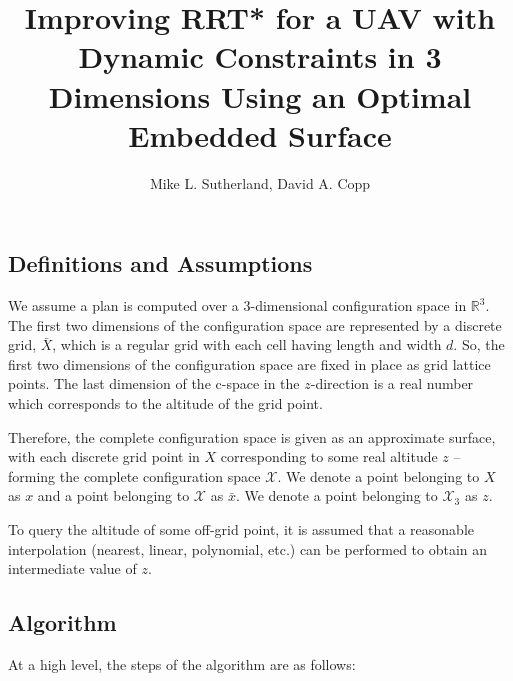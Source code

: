 \documentclass[letterpaper, 10 pt, conference]{ieeeconf}
\title{Improving RRT* for a UAV with Dynamic Constraints in 3 Dimensions Using an Optimal Embedded Surface}
\author{Mike L. Sutherland, David A. Copp}
\begin{document}
\maketitle

\subsection{Definitions and Assumptions}
We assume a plan is computed over a 3-dimensional configuration space in $\mathbb{R}^3$. The first two dimensions of the configuration space are represented by a discrete grid, $\bar{X}$, which is a regular grid with each cell having length and width $d$. So, the first two dimensions of the configuration space are fixed in place as grid lattice points. The last dimension of the c-space in the $z$-direction is a real number which corresponds to the altitude of the grid point.

Therefore, the complete configuration space is given as an approximate surface, with each discrete grid point in $X$ corresponding to some real altitude $z$ -- forming the complete configuration space $\mathcal{X}$. We denote a point belonging to $X$ as $x$ and a point belonging to $\mathcal{X}$ as $\bar{x}$. We denote a point belonging to $\mathcal{X}_3$ as $z$.

To query the altitude of some off-grid point, it is assumed that a reasonable interpolation (nearest, linear, polynomial, etc.) can be performed to obtain an intermediate value of $z$.

\subsection{Algorithm}

At a high level, the steps of the algorithm are as follows:
\end{document}
